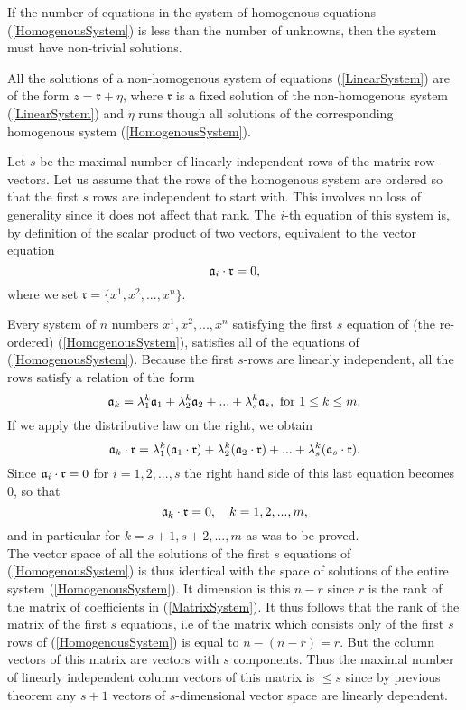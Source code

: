 \begin{theorem}
If the number of equations in the system of homogenous equations (\ref{HomogenousSystem}) is less than the number of unknowns, then the system must have non-trivial solutions. 
\end{theorem}

\begin{theorem}
All the solutions of a non-homogenous system of equations (\ref{LinearSystem}) are of the form $z = \mathfrak{r} + \eta$, where $\mathfrak{r}$ is a fixed solution of the non-homogenous system (\ref{LinearSystem})
and $\eta$ runs though all solutions of the corresponding homogenous system (\ref{HomogenousSystem}). 
\end{theorem}

Let $s$ be the maximal number of linearly independent rows of the matrix row vectors. Let us assume that the rows of the homogenous system are ordered so that the first $s$ rows are independent to 
start with. This involves no loss of generality since it does not affect that rank. The $i$-th equation of this system is, by definition of the scalar product of two vectors, equivalent to the vector equation
$$ \mathfrak{a}_i \cdot \mathfrak{r} = 0,$$ where we set $\mathfrak{r} = \{x^1, x^2, ..., x^n\}$.

Every system of $n$ numbers $x^1, x^2, ..., x^n$ satisfying the first $s$ equation of (the re-ordered) (\ref{HomogenousSystem}), satisfies all of the equations of (\ref{HomogenousSystem}). Because
the first $s$-rows are linearly independent, all the rows satisfy a relation of the form
$$\mathfrak{a}_k = \lambda^k_1 \mathfrak{a}_1 + \lambda^k_2 \mathfrak{a}_2 + ...  + \lambda^k_s \mathfrak{a}_s, \hbox{~for~} 1\le k \le m.$$ If we apply the distributive law on the right, we obtain
$$\mathfrak{a}_k \cdot \mathfrak{r} =   \lambda^k_1 (\mathfrak{a}_1\cdot \mathfrak{r}) + \lambda^k_2 (\mathfrak{a}_2 \cdot \mathfrak{r})+ ...  + \lambda^k_s (\mathfrak{a}_s\cdot \mathfrak{r}).$$ Since $\mathfrak{a}_i \cdot \mathfrak{r} = 0$ for $i = 1,2, ..., s$ the right hand side 
of this last equation becomes $0$, so that $$\mathfrak{a}_k \cdot \mathfrak{r} = 0, \quad k = 1,2, ..., m,$$ and in particular for $k = s+1, s+2, ..., m$ as was to be proved.\\

The vector space of all the solutions of the first $s$ equations of (\ref{HomogenousSystem}) is thus identical with the space of solutions of the entire system (\ref{HomogenousSystem}). It dimension is this $n-r$
since $r$ is the rank of the matrix of coefficients in (\ref{MatrixSystem}). It thus follows that the rank of the matrix of the first $s$ equations, i.e of the matrix which consists only of the first $s$ rows of (\ref{HomogenousSystem})
is equal to $n - (n-r) = r$. But the column vectors of this matrix are vectors with $s$ components. Thus the maximal number of linearly independent column vectors of this matrix is $\le s$ since by previous theorem
any $s+1$ vectors of $s$-dimensional vector space are linearly dependent. \\

